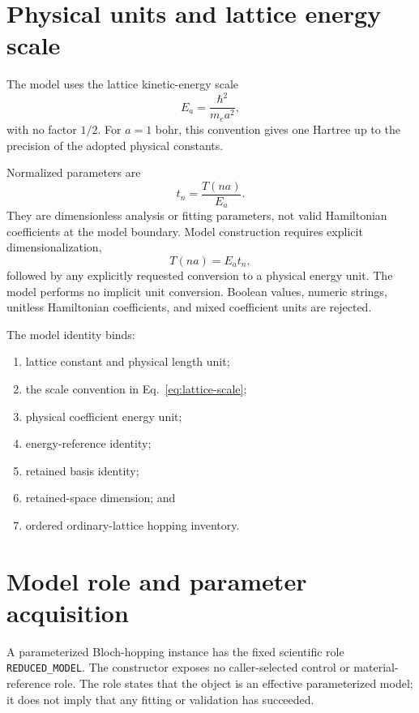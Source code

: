 \documentclass[11pt]{article}
\newcommand{\Ea}{E_{a}}
\begin{document}
\section{Physical units and lattice energy scale}

The model uses the lattice kinetic-energy scale
\begin{equation}
  \Ea=\frac{\hbar^2}{m_ea^2},
  \label{eq:lattice-scale}
\end{equation}
with no factor $1/2$.  For $a=1$ bohr, this convention gives one Hartree up to the
precision of the adopted physical constants.

Normalized parameters are
\begin{equation}
  t_n=\frac{T(na)}{\Ea}.
\end{equation}
They are dimensionless analysis or fitting parameters, not valid Hamiltonian
coefficients at the model boundary.  Model construction requires explicit
dimensionalization,
\begin{equation}
  T(na)=\Ea t_n,
\end{equation}
followed by any explicitly requested conversion to a physical energy unit.  The model
performs no implicit unit conversion.  Boolean values, numeric strings, unitless
Hamiltonian coefficients, and mixed coefficient units are rejected.

The model identity binds:
\begin{enumerate}[leftmargin=*]
  \item lattice constant and physical length unit;
  \item the scale convention in Eq.~\eqref{eq:lattice-scale};
  \item physical coefficient energy unit;
  \item energy-reference identity;
  \item retained basis identity;
  \item retained-space dimension; and
  \item ordered ordinary-lattice hopping inventory.
\end{enumerate}

\section{Model role and parameter acquisition}

A parameterized Bloch-hopping instance has the fixed scientific role
\texttt{REDUCED\_MODEL}.  The constructor exposes no caller-selected
control or material-reference role.  The role states that the object is an effective
parameterized model; it does not imply that any fitting or validation has succeeded.
\end{document}
